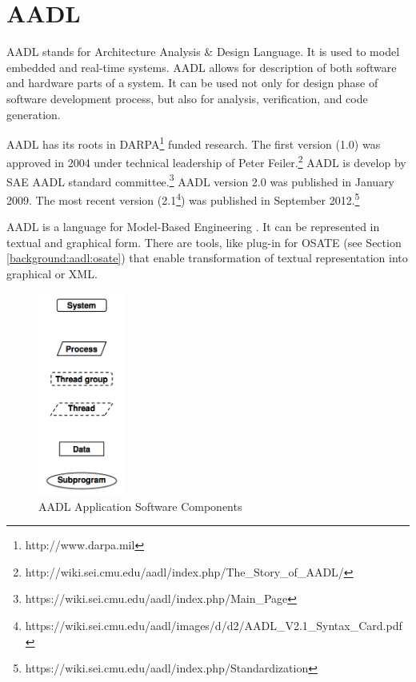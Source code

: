 \section{AADL}
\label{background:aadl}

AADL stands for Architecture Analysis \& Design Language. It is used to model embedded and real-time systems. AADL allows for description of both software and hardware parts of a system. It can be used not only for design phase of software development process, but also for analysis, verification, and code generation.

AADL has its roots in DARPA\footnote{http://www.darpa.mil} funded research. The first version (1.0) was approved in 2004 under technical leadership of Peter Feiler.\footnote{http://wiki.sei.cmu.edu/aadl/index.php/The\_Story\_of\_AADL/} AADL is develop by SAE AADL standard committee.\footnote{https://wiki.sei.cmu.edu/aadl/index.php/Main\_Page} AADL version 2.0 was published in January 2009. The most recent version (2.1\footnote{https://wiki.sei.cmu.edu/aadl/images/d/d2/AADL\_V2.1\_Syntax\_Card.pdf}) was published in September 2012.\footnote{https://wiki.sei.cmu.edu/aadl/index.php/Standardization}

AADL is a language for Model-Based Engineering \cite{AadlBook}. It can be represented in textual and graphical form. There are tools, like plug-in for OSATE (see Section \ref{background:aadl:osate}) that enable transformation of textual representation into graphical or XML. 

\begin{figure}
  \begin{center}
    \includegraphics[width=0.25\textwidth]{figures/aadl-app-components.png}
  \end{center}
  \caption{AADL Application Software Components}
  \label{figure:aadl_app_software_components}
\end{figure}

